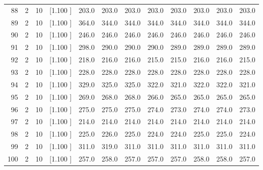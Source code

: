 \documentclass[12pt,a4paper]{article}
\begin{document}
\begin{center}
{\begin{tabular}{r r r r r r r r r r r r}
  88&  2& 10&[1.100     ]&   203.0&   203.0&   203.0&   203.0&   203.0&   203.0&   203.0&   203.0\\[-0.02in]
  89&  2& 10&[1.100     ]&   364.0&   344.0&   344.0&   344.0&   344.0&   344.0&   344.0&   344.0\\[-0.02in]
  90&  2& 10&[1.100     ]&   246.0&   246.0&   246.0&   246.0&   246.0&   246.0&   246.0&   246.0\\[-0.02in]
  91&  2& 10&[1.100     ]&   298.0&   290.0&   290.0&   290.0&   289.0&   289.0&   289.0&   289.0\\[-0.02in]
  92&  2& 10&[1.100     ]&   218.0&   216.0&   216.0&   215.0&   215.0&   216.0&   216.0&   215.0\\[-0.02in]
  93&  2& 10&[1.100     ]&   228.0&   228.0&   228.0&   228.0&   228.0&   228.0&   228.0&   228.0\\[-0.02in]
  94&  2& 10&[1.100     ]&   329.0&   325.0&   325.0&   322.0&   321.0&   322.0&   322.0&   321.0\\[-0.02in]
  95&  2& 10&[1.100     ]&   269.0&   268.0&   268.0&   266.0&   265.0&   265.0&   265.0&   265.0\\[-0.02in]
  96&  2& 10&[1.100     ]&   275.0&   275.0&   275.0&   274.0&   273.0&   274.0&   274.0&   273.0\\[-0.02in]
  97&  2& 10&[1.100     ]&   214.0&   214.0&   214.0&   214.0&   214.0&   214.0&   214.0&   214.0\\[-0.02in]
  98&  2& 10&[1.100     ]&   225.0&   226.0&   225.0&   224.0&   224.0&   225.0&   225.0&   224.0\\[-0.02in]
  99&  2& 10&[1.100     ]&   311.0&   319.0&   311.0&   311.0&   311.0&   311.0&   311.0&   311.0\\[-0.02in]
 100&  2& 10&[1.100     ]&   257.0&   258.0&   257.0&   257.0&   257.0&   258.0&   258.0&   257.0\\[-0.02in]

\hline
\end{tabular}}
\end{center}
\end{document}

